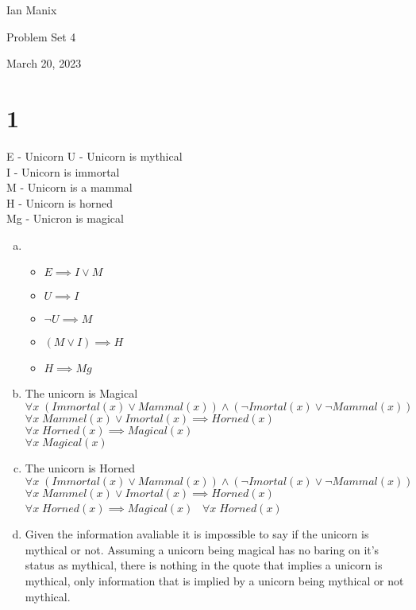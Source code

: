 \documentclass{article}
\begin{document}
    \begin{FlushLeft}
        Ian Manix

        Problem Set 4

        March 20, 2023
    \end{FlushLeft}


    \section*{1}
    E  - Unicorn
    U  - Unicorn is mythical \\
    I  - Unicorn is immortal \\
    M  - Unicorn is a mammal \\
    H  - Unicorn is horned \\
    Mg - Unicron is magical \\
    \begin{enumerate}[a)]
      
        \item 
            \begin{itemize}
                \item $E \implies I \lor M$
                \item $U \implies I$
                \item $\neg{U} \implies M$
                \item $(M \lor I) \implies H$
                \item $ H \implies Mg$
            \end{itemize}
            \item The unicorn is Magical \\
            $\forall{x}\; (Immortal(x) \lor Mammal(x)) \land (\neg Imortal(x) \lor \neg Mammal(x)) $ \\
            $\forall{x}\; Mammel(x) \lor Imortal(x) \implies Horned(x)$ \\
            $\forall{x}\; Horned(x) \implies Magical(x)$ \\
            $\forall{x}\; Magical(x)$

        \item The unicorn is Horned \\
            $\forall{x}\; (Immortal(x) \lor Mammal(x)) \land (\neg Imortal(x) \lor \neg Mammal(x)) $ \\
            $\forall{x}\; Mammel(x) \lor Imortal(x) \implies Horned(x)$ \\
            $\forall{x}\; Horned(x) \implies Magical(x)$ \
            $\forall{x}\; Horned(x)$ \\

        \item Given the information avaliable it is impossible to say if the unicorn is mythical or not. Assuming a unicorn being magical has no baring on it's status as mythical, there is nothing in the quote that implies a unicorn is mythical, only information that is implied by a unicorn being mythical or not mythical.


    \end{enumerate}
\end{document}

